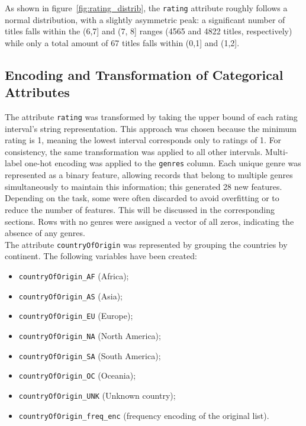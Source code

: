 As shown in figure~\ref{fig:rating_distrib}, the \texttt{rating} attribute roughly follows a normal distribution, with a slightly asymmetric peak:
a significant number of titles falls within the (6,7] and (7, 8] ranges (4565 and 4822 titles, respectively) while only a total amount of 67 titles falls within (0,1] and (1,2].


\subsection{Encoding and Transformation of Categorical Attributes}
The attribute \texttt{rating} was transformed by taking the upper bound of each rating
interval's string representation. This approach was chosen because the minimum rating is 1, meaning the
lowest interval corresponds only to ratings of 1. For consistency, the same transformation was applied
to all other intervals.
Multi-label one-hot encoding was applied to the \texttt{genres} column. 
Each unique genre was represented as a binary feature, allowing records that belong to multiple genres simultaneously to maintain this information; this generated 28 new features.
Depending on the task, some were often discarded to avoid overfitting or to reduce the number of features.
This will be discussed in the corresponding sections.
Rows with no genres were assigned a vector of all zeros, indicating the absence of any genres.\\

The attribute \texttt{countryOfOrigin} was represented by grouping the countries by continent.
The following variables have been created: 
\begin{multicols}{2}
    \begin{itemize}
        \item \texttt{countryOfOrigin\_AF} (Africa);
        \item \texttt{countryOfOrigin\_AS} (Asia);
        \item \texttt{countryOfOrigin\_EU} (Europe);
        \item \texttt{countryOfOrigin\_NA} (North America);
        \item \texttt{countryOfOrigin\_SA} (South America);
        \item \texttt{countryOfOrigin\_OC} (Oceania);
        \item \texttt{countryOfOrigin\_UNK} (Unknown country);
        \item \texttt{countryOfOrigin\_freq\_enc} (frequency encoding of the original list).
    \end{itemize}
\end{multicols}


